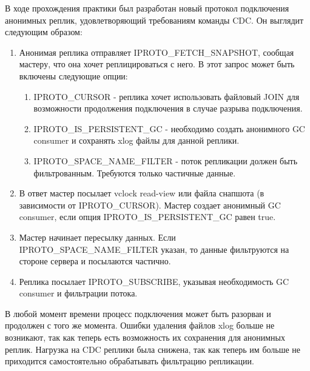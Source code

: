 \conclusion

В ходе прохождения практики был разработан новый протокол подключения анонимных реплик, удовлетворяющий требованиям команды CDC. Он выглядит следующим образом:

\begin{enumerate}
    \item Анонимая реплика отправляет IPROTO\_FETCH\_SNAPSHOT, сообщая мастеру, что она хочет реплицироваться с него. В этот запрос может быть включены следующие опции:
    \begin{enumerate}
        \item IPROTO\_CURSOR - реплика хочет использовать файловый JOIN для возможности продолжения подключения в случае разрыва подключения.
        \item IPROTO\_IS\_PERSISTENT\_GC - необходимо создать анонимного GC consumer и сохранять xlog файлы для данной реплики.
        \item IPROTO\_SPACE\_NAME\_FILTER - поток репликации должен быть фильтрованным. Требуются только частичные данные.
    \end{enumerate}
    \item В ответ мастер посылает vclock read-view или файла снапшота (в зависимости от IPROTO\_CURSOR). Мастер создает анонимный GC consumer, если опция IPROTO\_IS\_PERSISTENT\_GC равен true.
    \item Мастер начинает пересылку данных. Если IPROTO\_SPACE\_NAME\_FILTER указан, то данные фильтруются на стороне сервера и посылаются частично.
    \item Реплика посылает IPROTO\_SUBSCRIBE, указывая необходимость GC consumer и фильтрации потока.
\end{enumerate}

В любой момент времени процесс подключения может быть разорван и продолжен с того же момента. Ошибки удаления файлов xlog больше не возникают, так как теперь есть возможность их сохранения для анонимных реплик. Нагрузка на CDC реплики была снижена, так как теперь им больше не приходится самостоятельно обрабатывать фильтрацию репликации.
